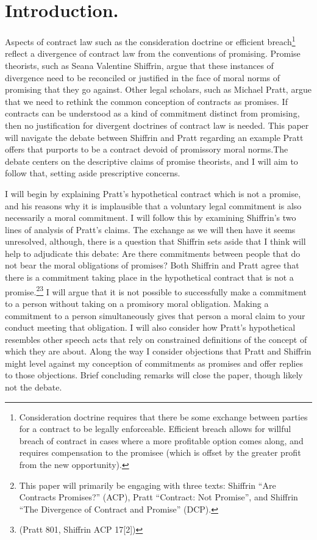 \section{Introduction.}

Aspects of contract law such as the consideration doctrine or efficient
breach\footnote{Consideration doctrine requires that there be some
  exchange between parties for a contract to be legally enforceable.
  Efficient breach allows for willful breach of contract in cases where
  a more profitable option comes along, and requires compensation to the
  promisee (which is offset by the greater profit from the new
  opportunity).} reflect a divergence of contract law from the
conventions of promising. Promise theorists, such as Seana Valentine
Shiffrin, argue that these instances of divergence need to be reconciled
or justified in the face of moral norms of promising that they go
against. Other legal scholars, such as Michael Pratt, argue that we need
to rethink the common conception of contracts as promises. If contracts
can be understood as a kind of commitment distinct from promising, then
no justification for divergent doctrines of contract law is needed. This
paper will navigate the debate between Shiffrin and Pratt regarding an
example Pratt offers that purports to be a contract devoid of promissory
moral norms.The debate centers on the descriptive claims of promise
theorists, and I will aim to follow that, setting aside prescriptive
concerns.

I will begin by explaining Pratt's hypothetical contract which is not a
promise, and his reasons why it is implausible that a voluntary legal
commitment is also necessarily a moral commitment. I will follow this by
examining Shiffrin's two lines of analysis of Pratt's claims. The
exchange as we will then have it seems unresolved, although, there is a
question that Shiffrin sets aside that I think will help to adjudicate
this debate: Are there commitments between people that do not bear the
moral obligations of promises? Both Shiffrin and Pratt agree that there
is a commitment taking place in the hypothetical contract that is not a
promise.\footnote{This paper will primarily be engaging with three
  texts: Shiffrin ``Are Contracts Promises?'' (ACP), Pratt ``Contract:
  Not Promise'', and Shiffrin ``The Divergence of Contract and Promise''
  (DCP).}\footnote{(Pratt 801, Shiffrin ACP 17{[}2{]})} I will argue
that it is not possible to successfully make a commitment to a person
without taking on a promisory moral obligation. Making a commitment to a
person simultaneously gives that person a moral claim to your conduct
meeting that obligation. I will also consider how Pratt's hypothetical
resembles other speech acts that rely on constrained definitions of the
concept of which they are about. Along the way I consider objections
that Pratt and Shiffrin might level against my conception of commitments
as promises and offer replies to those objections. Brief concluding
remarks will close the paper, though likely not the debate.


